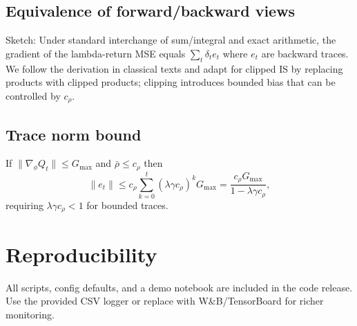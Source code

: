 \documentclass{article}
\begin{document}
\subsection{Equivalence of forward/backward views}
Sketch: Under standard interchange of sum/integral and exact arithmetic, the gradient of
the lambda-return MSE equals \(\sum_t \delta_t e_t\) where \(e_t\) are backward traces.
We follow the derivation in classical texts and adapt for clipped IS by replacing products
with clipped products; clipping introduces bounded bias that can be controlled by \(c_\rho\).

\subsection{Trace norm bound}
If \(\|\nabla_\phi Q_t\|\le G_{\max}\) and \(\bar\rho\le c_\rho\) then
\[
\|e_t\|\le c_\rho \sum_{k=0}^t (\lambda\gamma c_\rho)^k G_{\max} = \frac{c_\rho G_{\max}}{1-\lambda\gamma c_\rho},
\]
requiring \(\lambda\gamma c_\rho<1\) for bounded traces.

\section{Reproducibility}
All scripts, config defaults, and a demo notebook are included in the code release. Use
the provided CSV logger or replace with W&B/TensorBoard for richer monitoring.



\end{document}
